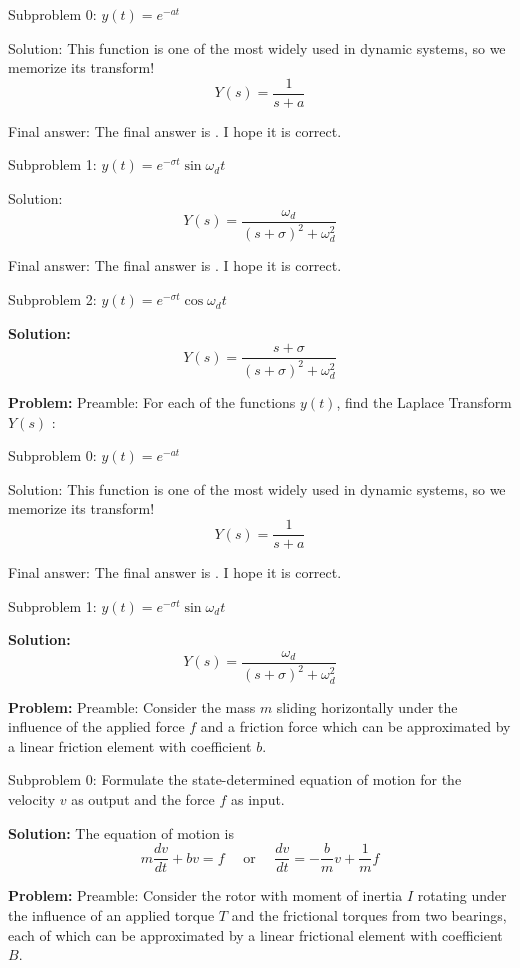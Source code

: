 \documentclass[10pt]{article}
\begin{document}
Subproblem 0: $y(t)=e^{-a t}$


Solution: This function is one of the most widely used in dynamic systems, so we memorize its transform!
\[
Y(s)=\boxed{\frac{1}{s+a}}
\]

Final answer: The final answer is . I hope it is correct.

Subproblem 1: $y(t)=e^{-\sigma t} \sin \omega_{d} t$


Solution: \[
Y(s)=\boxed{\frac{\omega_{d}}{(s+\sigma)^{2}+\omega_{d}^{2}}}
\]

Final answer: The final answer is . I hope it is correct.

Subproblem 2: $y(t)=e^{-\sigma t} \cos \omega_{d} t$


\textbf{Solution:}
\[
Y(s)=\boxed{\frac{s+\sigma}{(s+\sigma)^{2}+\omega_{d}^{2}}}
\]


\textbf{Problem:}
Preamble: For each of the functions $y(t)$, find the Laplace Transform $Y(s)$ :

Subproblem 0: $y(t)=e^{-a t}$


Solution: This function is one of the most widely used in dynamic systems, so we memorize its transform!
\[
Y(s)=\boxed{\frac{1}{s+a}}
\]

Final answer: The final answer is . I hope it is correct.

Subproblem 1: $y(t)=e^{-\sigma t} \sin \omega_{d} t$


\textbf{Solution:}
\[
Y(s)=\boxed{\frac{\omega_{d}}{(s+\sigma)^{2}+\omega_{d}^{2}}}
\]


\textbf{Problem:}
Preamble: Consider the mass \(m\) sliding horizontally under the influence of the applied force \(f\) and a friction force which can be approximated by a linear friction element with coefficient \(b\). 

Subproblem 0: Formulate the state-determined equation of motion for the velocity \(v\) as output and the force \(f\) as input.


\textbf{Solution:}
The equation of motion is
\[
\boxed{m \frac{d v}{d t}+b v=f} \quad \text { or } \quad \frac{d v}{d t}=-\frac{b}{m} v+\frac{1}{m} f
\]


\textbf{Problem:}
Preamble: Consider the rotor with moment of inertia \(I\) rotating under the influence of an applied torque \(T\) and the frictional torques from two bearings, each of which can be approximated by a linear frictional element with coefficient \(B\).
\end{document}
